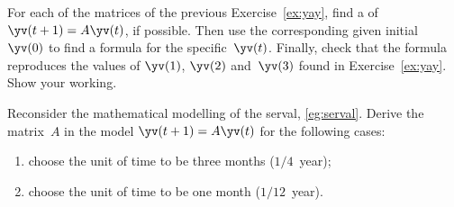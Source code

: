 \begin{exercise} \label{ex:} 
For each of the matrices of the previous Exercise~\ref{ex:yay}, find a  of \(\yv(t+1)=A\yv(t)\), if possible.
Then use the corresponding given initial~\(\yv(0)\) to find a formula for the specific~\(\yv(t)\).
Finally, check that the formula reproduces the values of \(\yv(1)\), \(\yv(2)\) and~\(\yv(3)\) found in Exercise~\ref{ex:yay}.
Show your working.
\end{exercise}





\begin{exercise} \label{ex:} 
Reconsider the mathematical modelling of the serval, \autoref{eg:serval}.
Derive the matrix~\(A\) in the model \(\yv(t+1)=A\yv(t)\) for the following cases:
\begin{enumerate}
\item choose the unit of time to be three months (\(1/4\)~year);

\item choose the unit of time to be one month  (\(1/12\)~year).

\end{enumerate}
\end{exercise}







